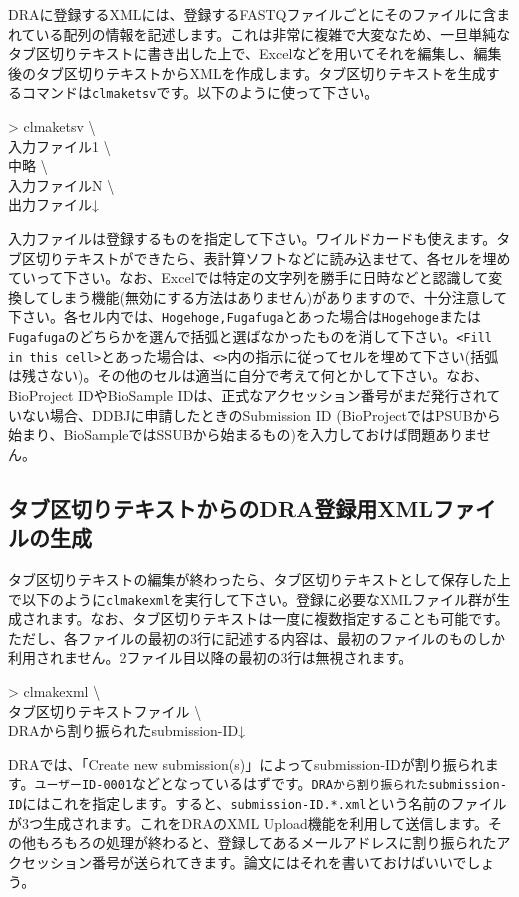 \documentclass[titlepage,10pt,a4paper]{jsbook}
\newenvironment{cmd}{\begin{oframed}\raggedright\ttfamily\footnotesize\setlength{\baselineskip}{1.4em}}{\end{oframed}\vspace{-1em}}
\begin{document}
DRAに登録するXMLには、登録するFASTQファイルごとにそのファイルに含まれている配列の情報を記述します。これは非常に複雑で大変なため、一旦単純なタブ区切りテキストに書き出した上で、Excelなどを用いてそれを編集し、編集後のタブ区切りテキストからXMLを作成します。タブ区切りテキストを生成するコマンドは\texttt{clmaketsv}です。以下のように使って下さい。
\begin{cmd}
{\textgreater} clmaketsv {\textbackslash}\\
入力ファイル1 {\textbackslash}\\
中略 {\textbackslash}\\
入力ファイルN {\textbackslash}\\
出力ファイル↓
\end{cmd}
入力ファイルは登録するものを指定して下さい。ワイルドカードも使えます。タブ区切りテキストができたら、表計算ソフトなどに読み込ませて、各セルを埋めていって下さい。なお、Excelでは特定の文字列を勝手に日時などと認識して変換してしまう機能(無効にする方法はありません)がありますので、十分注意して下さい。各セル内では、\texttt{{\lbrack}Hogehoge,Fugafuga{\rbrack}}とあった場合は\texttt{Hogehoge}または\texttt{Fugafuga}のどちらかを選んで括弧と選ばなかったものを消して下さい。\texttt{{\textless}Fill in this cell{\textgreater}}とあった場合は、\texttt{{\textless}{\textgreater}}内の指示に従ってセルを埋めて下さい(括弧は残さない)。その他のセルは適当に自分で考えて何とかして下さい。なお、BioProject IDやBioSample IDは、正式なアクセッション番号がまだ発行されていない場合、DDBJに申請したときのSubmission ID (BioProjectではPSUBから始まり、BioSampleではSSUBから始まるもの)を入力しておけば問題ありません。

\subsection{タブ区切りテキストからのDRA登録用XMLファイルの生成}

タブ区切りテキストの編集が終わったら、タブ区切りテキストとして保存した上で以下のように\texttt{clmakexml}を実行して下さい。登録に必要なXMLファイル群が生成されます。なお、タブ区切りテキストは一度に複数指定することも可能です。ただし、各ファイルの最初の3行に記述する内容は、最初のファイルのものしか利用されません。2ファイル目以降の最初の3行は無視されます。
\begin{cmd}
{\textgreater} clmakexml {\textbackslash}\\
タブ区切りテキストファイル {\textbackslash}\\
DRAから割り振られたsubmission-ID↓
\end{cmd}
DRAでは、「Create new submission(s)」によってsubmission-IDが割り振られます。\texttt{ユーザーID-0001}などとなっているはずです。\texttt{DRAから割り振られたsubmission-ID}にはこれを指定します。すると、\texttt{submission-ID.*.xml}という名前のファイルが3つ生成されます。これをDRAのXML Upload機能を利用して送信します。その他もろもろの処理が終わると、登録してあるメールアドレスに割り振られたアクセッション番号が送られてきます。論文にはそれを書いておけばいいでしょう。
\end{document}
